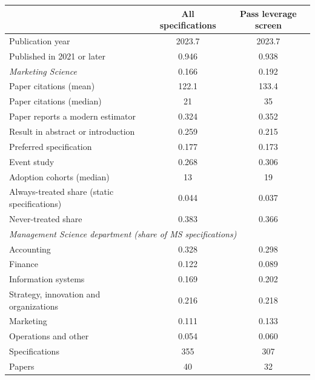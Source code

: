 \begin{tabular}{lcc}
\toprule
 & All specifications & Pass leverage screen \\
\midrule
Publication year & 2023.7 & 2023.7 \\
Published in 2021 or later & 0.946 & 0.938 \\
\emph{Marketing Science} & 0.166 & 0.192 \\
Paper citations (mean) & 122.1 & 133.4 \\
Paper citations (median) & 21 & 35 \\
Paper reports a modern estimator & 0.324 & 0.352 \\
Result in abstract or introduction & 0.259 & 0.215 \\
Preferred specification & 0.177 & 0.173 \\
Event study & 0.268 & 0.306 \\
Adoption cohorts (median) & 13 & 19 \\
Always-treated share (static specifications) & 0.044 & 0.037 \\
Never-treated share & 0.383 & 0.366 \\
\midrule
\multicolumn{3}{l}{\emph{Management Science department (share of MS specifications)}} \\
\quad Accounting & 0.328 & 0.298 \\
\quad Finance & 0.122 & 0.089 \\
\quad Information systems & 0.169 & 0.202 \\
\quad Strategy, innovation and organizations & 0.216 & 0.218 \\
\quad Marketing & 0.111 & 0.133 \\
\quad Operations and other & 0.054 & 0.060 \\
\midrule
Specifications & 355 & 307 \\
Papers & 40 & 32 \\
\bottomrule
\end{tabular}
